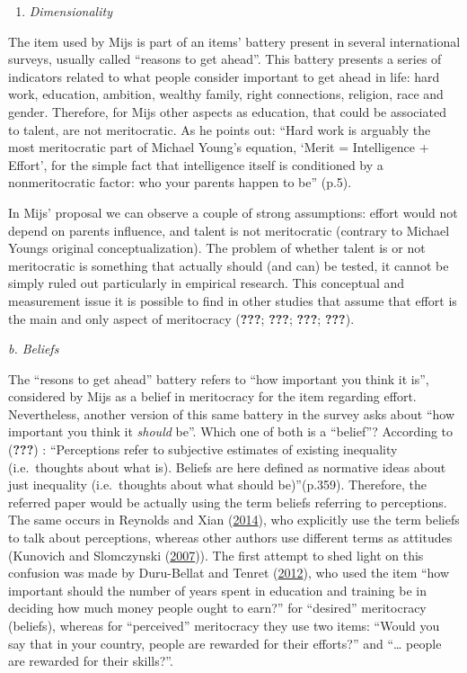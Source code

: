 \documentclass[
]{article}
\providecommand{\tightlist}{%
  \setlength{\itemsep}{0pt}\setlength{\parskip}{0pt}}
\begin{document}
\begin{enumerate}
\def\labelenumi{\alph{enumi}.}
\tightlist
\item
  \emph{Dimensionality}
\end{enumerate}

The item used by Mijs is part of an items' battery present in several
international surveys, usually called ``reasons to get ahead''. This
battery presents a series of indicators related to what people consider
important to get ahead in life: hard work, education, ambition, wealthy
family, right connections, religion, race and gender. Therefore, for
Mijs other aspects as education, that could be associated to talent, are
not meritocratic. As he points out: ``Hard work is arguably the most
meritocratic part of Michael Young's equation, `Merit = Intelligence +
Effort', for the simple fact that intelligence itself is conditioned by
a nonmeritocratic factor: who your parents happen to be'' (p.5).

In Mijs' proposal we can observe a couple of strong assumptions: effort
would not depend on parents influence, and talent is not meritocratic
(contrary to Michael Youngs original conceptualization). The problem of
whether talent is or not meritocratic is something that actually should
(and can) be tested, it cannot be simply ruled out particularly in
empirical research. This conceptual and measurement issue it is possible
to find in other studies that assume that effort is the main and only
aspect of meritocracy ({\textbf{???}}; {\textbf{???}}; {\textbf{???}};
{\textbf{???}}).

\emph{b. Beliefs}

The ``resons to get ahead'' battery refers to ``how important you think
it is'', considered by Mijs as a belief in meritocracy for the item
regarding effort. Nevertheless, another version of this same battery in
the survey asks about ``how important you think it \emph{should} be''.
Which one of both is a ``belief''? According to ({\textbf{???}}) :
``Perceptions refer to subjective estimates of existing inequality
(i.e.~thoughts about what is). Beliefs are here defined as normative
ideas about just inequality (i.e.~thoughts about what should
be)''(p.359). Therefore, the referred paper would be actually using the
term beliefs referring to perceptions. The same occurs in Reynolds and
Xian (\protect\hyperlink{ref-reynolds_perceptions_2014}{2014}), who
explicitly use the term beliefs to talk about perceptions, whereas other
authors use different terms as attitudes (Kunovich and Slomczynski
(\protect\hyperlink{ref-kunovich_systems_2007}{2007})). The first
attempt to shed light on this confusion was made by Duru-Bellat and
Tenret (\protect\hyperlink{ref-duru-bellat_whos_2012}{2012}), who used
the item ``how important should the number of years spent in education
and training be in deciding how much money people ought to earn?'' for
``desired'' meritocracy (beliefs), whereas for ``perceived'' meritocracy
they use two items: ``Would you say that in your country, people are
rewarded for their efforts?'' and ``\ldots{} people are rewarded for
their skills?''.
\end{document}
